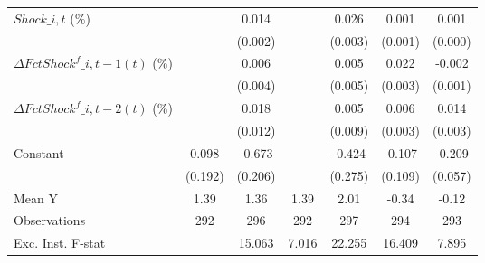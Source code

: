 {\begin{tabular}{l*{6}{c}}
\addlinespace
$ Shock\_{i,t}$ (\%) &                     &       0.014\sym{***}&                     &       0.026\sym{***}&       0.001         &       0.001\sym{*}  \\
                    &                     &     (0.002)         &                     &     (0.003)         &     (0.001)         &     (0.000)         \\
\addlinespace
$ \Delta FctShock^f\_{i,t-1}(t)$ (\%)&                     &       0.006         &                     &       0.005         &       0.022\sym{***}&      -0.002         \\
                    &                     &     (0.004)         &                     &     (0.005)         &     (0.003)         &     (0.001)         \\
\addlinespace
$ \Delta FctShock^f\_{i,t-2}(t)$ (\%)&                     &       0.018         &                     &       0.005         &       0.006\sym{*}  &       0.014\sym{***}\\
                    &                     &     (0.012)         &                     &     (0.009)         &     (0.003)         &     (0.003)         \\
\addlinespace
Constant            &       0.098         &      -0.673\sym{***}&                     &      -0.424         &      -0.107         &      -0.209\sym{***}\\
                    &     (0.192)         &     (0.206)         &                     &     (0.275)         &     (0.109)         &     (0.057)         \\
\midrule
Mean Y              &        1.39         &        1.36         &        1.39         &        2.01         &       -0.34         &       -0.12         \\
Observations        &         292         &         296         &         292         &         297         &         294         &         293         \\
Exc. Inst. F-stat   &                     &      15.063         &       7.016         &      22.255         &      16.409         &       7.895         \\
\bottomrule
\end{tabular}
}
